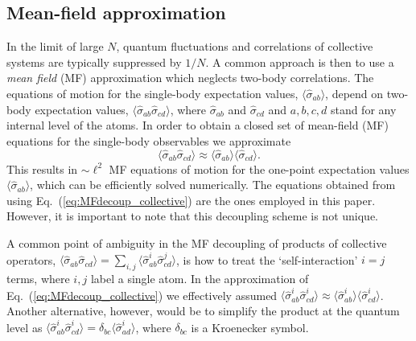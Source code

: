 \documentclass[aps,prx,superscriptaddress,twocolumn,notitlepage,nofootinbib,longbibliography]{revtex4-2}
\begin{document}

\subsection{Mean-field approximation}

In the limit of large $N$, quantum fluctuations and correlations of collective systems are typically suppressed by $1/N$. A common approach is then to use a \emph{mean field} (MF) approximation which neglects two-body correlations.
The equations of motion for the single-body expectation values, $\langle \hat{\sigma}_{ab} \rangle$, depend on two-body expectation values, $\langle \hat{\sigma}_{ab} \hat{\sigma}_{cd} \rangle$, where $\hat{\sigma}_{ab}$ and $\hat{\sigma}_{cd}$ and $a,b,c,d$ stand for any internal level of the atoms. In order to obtain a closed set of mean-field (MF) equations for the single-body observables we approximate
\begin{equation}
    \langle \hat{\sigma}_{ab} \hat{\sigma}_{cd} \rangle \approx \langle \hat{\sigma}_{ab} \rangle \langle \hat{\sigma}_{cd} \rangle.
\label{eq:MFdecoup_collective}
\end{equation}
This results in $\sim \ell^2$ MF equations of motion for the one-point expectation values $\langle \hat{\sigma}_{ab} \rangle$, which can be efficiently solved numerically.
The equations obtained from using Eq.~(\ref{eq:MFdecoup_collective})  are the ones employed in this paper.
However, it is important to note that this decoupling scheme is not unique.

A common point of ambiguity in the MF decoupling of products of collective operators, $\langle \hat{\sigma}_{ab}\hat{\sigma}_{cd} \rangle= \sum_{i,j} \langle \hat{\sigma}_{ab}^i\hat{\sigma}^j_{cd} \rangle$, is how to treat the `self-interaction' $i=j$ terms, where $i,j$ label a single atom. In the approximation of Eq.~(\ref{eq:MFdecoup_collective}) we effectively assumed $\langle \hat{\sigma}^i_{ab} \hat{\sigma}^i_{cd} \rangle \approx \langle \hat{\sigma}^i_{ab} \rangle \langle \hat{\sigma}^i_{cd} \rangle$.
Another alternative, however, would be to simplify the product at the quantum level as $\langle \hat{\sigma}^i_{ab} \hat{\sigma}^i_{cd} \rangle = \delta_{bc} \langle \hat{\sigma}^i_{ad} \rangle$, where $\delta_{bc}$ is a Kroenecker symbol.
\end{document}
